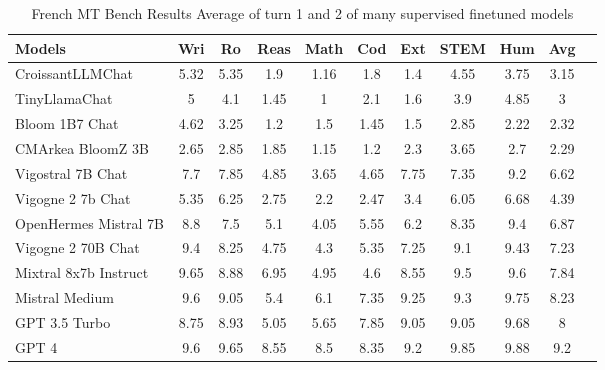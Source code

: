 \begin{table}[h]
\centering
\begin{tabular}{lcccccccccc}
\hline
Models & Wri & Ro & Reas & Math & Cod & Ext & STEM & Hum & Avg \\
\hline
CroissantLLMChat & 5.32 & 5.35 & 1.9 & 1.16 & 1.8 & 1.4 & 4.55 & 3.75 & 3.15 \\
TinyLlamaChat & 5 & 4.1 & 1.45 & 1 & 2.1 & 1.6 & 3.9 & 4.85 & 3 \\
Bloom 1B7 Chat & 4.62 & 3.25 & 1.2 & 1.5 & 1.45 & 1.5 & 2.85 & 2.22 & 2.32 \\
CMArkea BloomZ 3B & 2.65 & 2.85 & 1.85 & 1.15 & 1.2 & 2.3 & 3.65 & 2.7 & 2.29 \\
\hline
Vigostral 7B Chat & 7.7 & 7.85 & 4.85 & 3.65 & 4.65 & 7.75 & 7.35 & 9.2 & 6.62 \\
Vigogne 2 7b Chat & 5.35 & 6.25 & 2.75 & 2.2 & 2.47 & 3.4 & 6.05 & 6.68 & 4.39 \\
OpenHermes Mistral 7B & 8.8 & 7.5 & 5.1 & 4.05 & 5.55 & 6.2 & 8.35 & 9.4 & 6.87 \\
Vigogne 2 70B Chat & 9.4 & 8.25 & 4.75 & 4.3 & 5.35 & 7.25 & 9.1 & 9.43 & 7.23 \\
Mixtral 8x7b Instruct & 9.65 & 8.88 & 6.95 & 4.95 & 4.6 & 8.55 & 9.5 & 9.6 & 7.84 \\
Mistral Medium & 9.6 & 9.05 & 5.4 & 6.1 & 7.35 & 9.25 & 9.3 & 9.75 & 8.23 \\
GPT 3.5 Turbo & 8.75 & 8.93 & 5.05 & 5.65 & 7.85 & 9.05 & 9.05 & 9.68 & 8 \\
GPT 4 & 9.6 & 9.65 & 8.55 & 8.5 & 8.35 & 9.2 & 9.85 & 9.88 & 9.2 \\
\hline
\end{tabular}
\caption[French MT Bench average]{French MT Bench Results Average of turn 1 and 2 of many supervised finetuned models}
\label{tab:mt_bench_all_fr}
\end{table}

